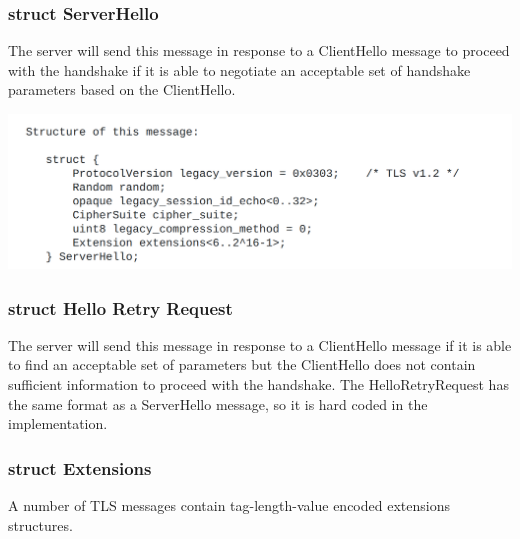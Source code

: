\documentclass{article}
\begin{document}
\subsubsection{struct ServerHello}
The server will send this message in response to a ClientHello
message to proceed with the handshake if it is able to negotiate an
acceptable set of handshake parameters based on the ClientHello.
\begin{center}
    \includegraphics[width=1.1\columnwidth]{media/ServerHello.png}
\end{center}

\subsubsection{struct Hello Retry Request}
The server will send this message in response to a ClientHello
message if it is able to find an acceptable set of parameters but the
ClientHello does not contain sufficient information to proceed with the handshake.
The HelloRetryRequest has the same format as a ServerHello message,
so it is hard coded in the implementation.

\subsubsection{struct Extensions}
A number of TLS messages contain tag-length-value encoded extensions structures.
\end{document}
